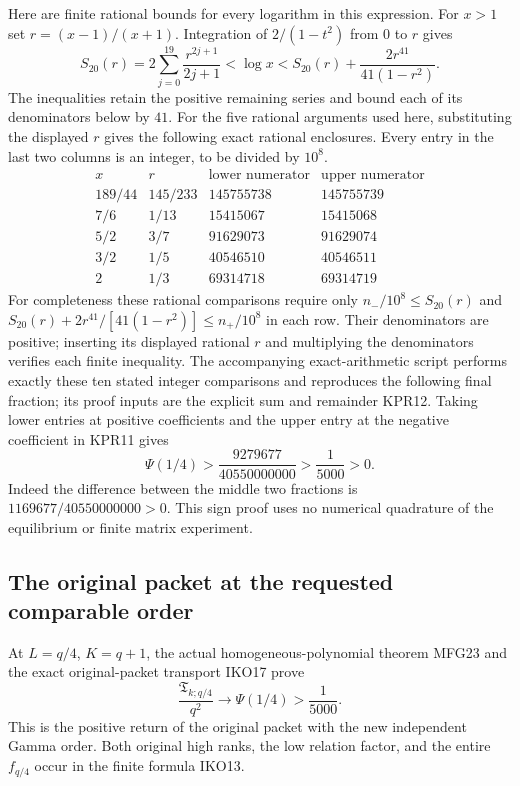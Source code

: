 Here are finite rational bounds for every logarithm in this expression.
For $x>1$ set $r=(x-1)/(x+1)$. Integration of
$2/(1-t^2)$ from $0$ to $r$ gives
\[
 S_{20}(r)=2\sum_{j=0}^{19}\frac{r^{2j+1}}{2j+1}
 <\log x
 <S_{20}(r)+\frac{2r^{41}}{41(1-r^2)}.
 \tag{KPR12}
\]
The inequalities retain the positive remaining series and bound
each of its denominators below by $41$. For the five rational
arguments used here, substituting the displayed $r$ gives the
following exact rational enclosures. Every entry in the last two
columns is an integer, to be divided by $10^8$.
\[
 \begin{array}{c|c|r|r}
 x&r&\text{lower numerator}&\text{upper numerator}\\\hline
 189/44&145/233&145755738&145755739\\
 7/6&1/13&15415067&15415068\\
 5/2&3/7&91629073&91629074\\
 3/2&1/5&40546510&40546511\\
 2&1/3&69314718&69314719
 \end{array}
 \tag{KPR13}
\]
For completeness these rational comparisons require only
$n_-/10^8\leq S_{20}(r)$ and
$S_{20}(r)+2r^{41}/[41(1-r^2)]\leq n_+/10^8$ in each row.
Their denominators are positive; inserting its displayed rational
$r$ and multiplying the denominators verifies each finite inequality.
The accompanying exact-arithmetic script performs exactly these ten
stated integer comparisons and reproduces the following final
fraction; its proof inputs are the explicit sum and remainder KPR12.
Taking lower entries at positive coefficients and the upper entry
at the negative coefficient in KPR11 gives
\[
 \boxed{\Psi(1/4)>\frac{9279677}{40550000000}
                     >\frac1{5000}>0.}
 \tag{KPR14}
\]
Indeed the difference between the middle two fractions is
$1169677/40550000000>0$. This sign proof uses no numerical
quadrature of the equilibrium or finite matrix experiment.

\subsection{The original packet at the requested comparable order}
At $L=q/4$, $K=q+1$, the actual homogeneous-polynomial theorem MFG23
and the exact original-packet transport IKO17 prove
\[
 \boxed{\frac{\mathfrak T_{k;q/4}}{q^2}
           \longrightarrow\Psi(1/4)>\frac1{5000}.}
 \tag{KPR15}
\]
This is the positive return of the original packet with the new
independent Gamma order. Both original high ranks, the low relation
factor, and the entire $f_{q/4}$ occur in the finite formula IKO13.

